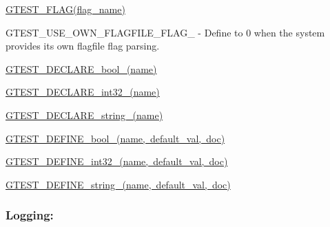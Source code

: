 \begin{DoxyItemize}
\item {\ttfamily \mbox{\hyperlink{_obj__test_2lib_2googletest-release-1_88_81_2googletest_2include_2gtest_2internal_2gtest-port_8h_a828f4e34a1c4b510da50ec1563e3562a}{G\+T\+E\+S\+T\+\_\+\+F\+L\+A\+G(flag\+\_\+name)}}}
\item {\ttfamily G\+T\+E\+S\+T\+\_\+\+U\+S\+E\+\_\+\+O\+W\+N\+\_\+\+F\+L\+A\+G\+F\+I\+L\+E\+\_\+\+F\+L\+A\+G\+\_\+} -\/ Define to 0 when the system provides its own flagfile flag parsing.
\item {\ttfamily \mbox{\hyperlink{_obj__test_2lib_2googletest-release-1_88_81_2googletest_2include_2gtest_2internal_2gtest-port_8h_a14eb0e9c6e0df765d1fbfd2db6966d14}{G\+T\+E\+S\+T\+\_\+\+D\+E\+C\+L\+A\+R\+E\+\_\+bool\+\_\+(name)}}}
\item {\ttfamily \mbox{\hyperlink{_obj__test_2lib_2googletest-release-1_88_81_2googletest_2include_2gtest_2internal_2gtest-port_8h_aab2ee98cb616054b1d3a7dc71efe81fc}{G\+T\+E\+S\+T\+\_\+\+D\+E\+C\+L\+A\+R\+E\+\_\+int32\+\_\+(name)}}}
\item {\ttfamily \mbox{\hyperlink{_obj__test_2lib_2googletest-release-1_88_81_2googletest_2include_2gtest_2internal_2gtest-port_8h_a9f74eee05f7ee5534139a622fe7da7dd}{G\+T\+E\+S\+T\+\_\+\+D\+E\+C\+L\+A\+R\+E\+\_\+string\+\_\+(name)}}}
\item {\ttfamily \mbox{\hyperlink{_obj__test_2lib_2googletest-release-1_88_81_2googletest_2include_2gtest_2internal_2gtest-port_8h_a48e05814779e5a2f432b06a12618a760}{G\+T\+E\+S\+T\+\_\+\+D\+E\+F\+I\+N\+E\+\_\+bool\+\_\+(name, default\+\_\+val, doc)}}}
\item {\ttfamily \mbox{\hyperlink{_obj__test_2lib_2googletest-release-1_88_81_2googletest_2include_2gtest_2internal_2gtest-port_8h_a88ee2f19589ffff86ca742fd33611358}{G\+T\+E\+S\+T\+\_\+\+D\+E\+F\+I\+N\+E\+\_\+int32\+\_\+(name, default\+\_\+val, doc)}}}
\item {\ttfamily \mbox{\hyperlink{_obj__test_2lib_2googletest-release-1_88_81_2googletest_2include_2gtest_2internal_2gtest-port_8h_a885e18fe217a6e85553d408b99252c12}{G\+T\+E\+S\+T\+\_\+\+D\+E\+F\+I\+N\+E\+\_\+string\+\_\+(name, default\+\_\+val, doc)}}}
\end{DoxyItemize}

\subsubsection*{Logging\+:}


